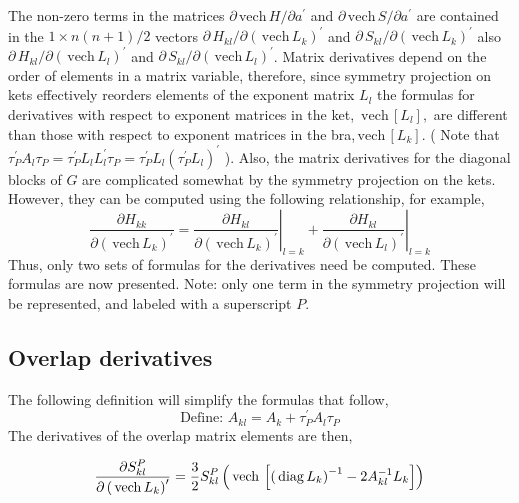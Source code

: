 \documentclass[12pt,thmsa]{article}
\begin{document}
The non-zero terms in the matrices $\partial \,\mathrm{vech}\,H/\partial
a^{\prime }$ and $\partial \,\mathrm{vech}\,S/\partial a^{\prime }$ are
contained in the $1\times n\left( n+1\right) /2$ vectors $\partial
\,H_{kl}/\partial \left( \,\mathrm{vech}\,L_k\right) ^{\prime }$ and $%
\partial \,S_{kl}/\partial \left( \,\mathrm{vech}\,L_k\right) ^{\prime }$
also $\partial \,H_{kl}/\partial \left( \,\mathrm{vech}\,L_l\right) ^{\prime
}$ and $\partial \,S_{kl}/\partial \left( \,\mathrm{vech}\,L_l\right)
^{\prime }$. Matrix derivatives depend on the order of elements in a matrix
variable, therefore, since symmetry projection on kets effectively reorders
elements of the exponent matrix $L_l$ the formulas for derivatives with
respect to exponent matrices in the ket, $\,\mathrm{vech}\,\left[ L_l\right]
,$ are different than those with respect to exponent matrices in the bra,$\,%
\mathrm{vech}\,\left[ L_k\right] $. ( Note that $\tau _P^{\prime }A_l\tau
_P=\tau _P^{\prime }L_lL_l^{\prime }\tau _P=\tau _P^{\prime }L_l\left( \tau
_P^{\prime }L_l\right) ^{\prime }$ ). Also, the matrix derivatives for the
diagonal blocks of $G$ are complicated somewhat by the symmetry projection
on the kets. However, they can be computed using the following relationship,
for example, 
\begin{equation}
\frac{\partial H_{kk}}{\partial \left( \,\mathrm{vech}\,L_k\right) ^{\prime }%
}=\left. \frac{\partial H_{kl}}{\partial \left( \,\mathrm{vech}\,L_k\right)
^{\prime }}\right| _{l=k}+\left. \frac{\partial H_{kl}}{\partial \left( \,%
\mathrm{vech}\,L_l\right) ^{\prime }}\right| _{l=k}
\end{equation}
Thus, only two sets of formulas for the derivatives need be computed. These
formulas are now presented. Note: only one term in the symmetry projection
will be represented, and labeled with a superscript $P$.

\subsection{Overlap derivatives}

The following definition will simplify the formulas that follow, 
\begin{equation}
\text{Define: }A_{kl}=A_k+\tau _P^{\prime }A_l\tau _P
\end{equation}
The derivatives of the overlap matrix elements are then,

\begin{equation}
\frac{\partial S_{kl}^P}{\partial \left( \,\mathrm{vech}\,L_k\right)
^{\prime }}=\frac 32S_{kl}^P\left( \,\mathrm{vech}\,\left[ \left( \,\mathrm{%
diag}\,L_k\right) ^{-1}-2A_{kl}^{-1}L_k\right] \right)
\end{equation}
\end{document}
